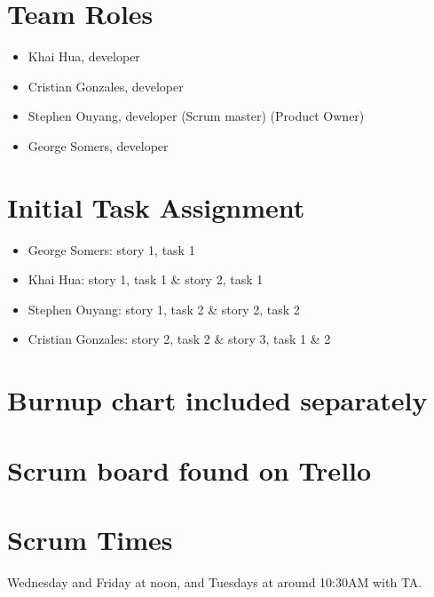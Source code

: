 \documentclass[11pt]{article}
\begin{document}
	\section{Team Roles}
		\vspace{-3mm}
		\begin{itemize}
		    \item Khai Hua, developer
		    \item Cristian Gonzales, developer
		    \item Stephen Ouyang, developer (Scrum master) (Product Owner)
		    \item George Somers, developer
		\end{itemize}
	\section{Initial Task Assignment}
	    \vspace{-3mm}
	    \begin{itemize}
		    \item George Somers: story 1, task 1
		    \item Khai Hua: story 1, task 1 \& story 2, task 1
		    \item Stephen Ouyang: story 1, task 2 \& story 2, task 2
		    \item Cristian Gonzales: story 2, task 2 \& story 3, task 1 \& 2
		\end{itemize}
	\section{Burnup chart included separately}
	\section{Scrum board found on Trello}
	\section{Scrum Times}
	    Wednesday and Friday at noon, and Tuesdays at around 10:30AM with TA.
\end{document}
